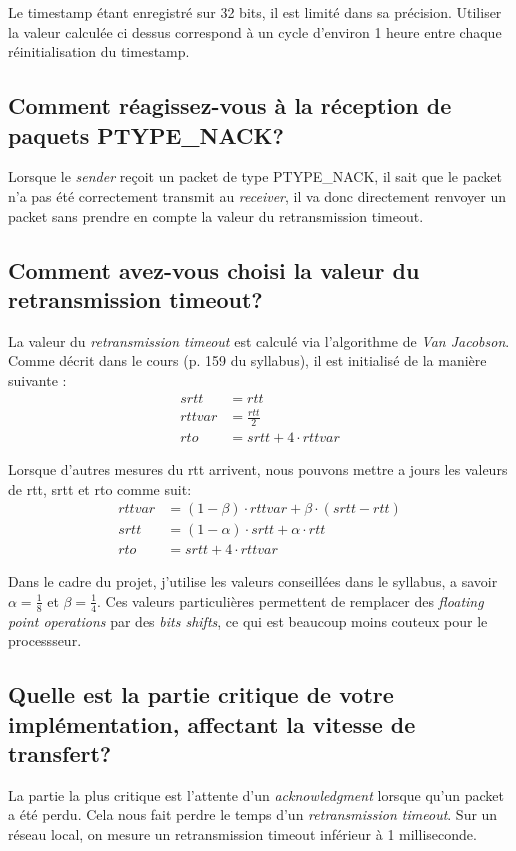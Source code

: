\documentclass[10pt,a4paper]{article}
\begin{document}
Le timestamp étant enregistré sur 32 bits, il est limité dans sa précision. Utiliser la valeur calculée ci dessus correspond à un cycle d'environ 1 heure entre chaque réinitialisation du timestamp.

\subsection{Comment réagissez-vous à la réception de paquets PTYPE\_NACK?}
Lorsque le \textit{sender} reçoit un packet de type PTYPE\_NACK, il sait que le packet n'a pas été correctement transmit au \textit{receiver}, il va donc directement renvoyer un packet sans prendre en compte la valeur du retransmission timeout. 


\subsection{Comment avez-vous choisi la valeur du retransmission timeout?}
La valeur du \textit{retransmission timeout} est calculé via l'algorithme de \textit{Van Jacobson}. Comme décrit dans le cours (p. 159 du syllabus), il est initialisé de la manière suivante : 
\begin{align*}
	srtt &= rtt \\
	rttvar &= \frac{rtt}{2} \\
	rto &= srtt + 4 \cdot rttvar
\end{align*}

Lorsque d'autres mesures du rtt arrivent, nous pouvons mettre a jours les valeurs de rtt, srtt et rto comme suit:
\begin{align*}
	rttvar &= (1-\beta) \cdot rttvar + \beta \cdot (srtt - rtt) \\
	srtt &= (1-\alpha) \cdot srtt + \alpha \cdot rtt \\
	rto &= srtt + 4 \cdot rttvar
\end{align*}

Dans le cadre du projet, j'utilise les valeurs conseillées dans le syllabus, a savoir $\alpha = \frac{1}{8}$ et $\beta = \frac{1}{4}$. Ces valeurs particulières permettent de remplacer des \textit{floating point operations} par des \textit{bits shifts}, ce qui est beaucoup moins couteux pour le processseur.

\subsection{Quelle est la partie critique de votre implémentation, affectant la vitesse de transfert?}
La partie la plus critique est l'attente d'un \textit{acknowledgment} lorsque qu'un packet a été perdu. Cela nous fait perdre le temps d'un \textit{retransmission timeout}. Sur un réseau local, on mesure un retransmission timeout inférieur à 1 milliseconde.
\end{document}
